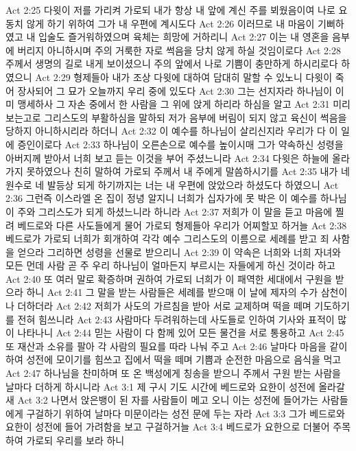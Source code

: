 Act 2:25  다윗이 저를 가리켜 가로되 내가 항상 내 앞에 계신 주를 뵈웠음이여 나로 요동치 않게 하기 위하여 그가 내 우편에 계시도다
Act 2:26  이러므로 내 마음이 기뻐하였고 내 입술도 즐거워하였으며 육체는 희망에 거하리니
Act 2:27  이는 내 영혼을 음부에 버리지 아니하시며 주의 거룩한 자로 썩음을 당치 않게 하실 것임이로다
Act 2:28  주께서 생명의 길로 내게 보이셨으니 주의 앞에서 나로 기쁨이 충만하게 하시리로다 하였으니
Act 2:29  형제들아 내가 조상 다윗에 대하여 담대히 말할 수 있노니 다윗이 죽어 장사되어 그 묘가 오늘까지 우리 중에 있도다
Act 2:30  그는 선지자라 하나님이 이미 맹세하사 그 자손 중에서 한 사람을 그 위에 앉게 하리라 하심을 알고
Act 2:31  미리 보는고로 그리스도의 부활하심을 말하되 저가 음부에 버림이 되지 않고 육신이 썩음을 당하지 아니하시리라 하더니
Act 2:32  이 예수를 하나님이 살리신지라 우리가 다 이 일에 증인이로다
Act 2:33  하나님이 오른손으로 예수를 높이시매 그가 약속하신 성령을 아버지께 받아서 너희 보고 듣는 이것을 부어 주셨느니라
Act 2:34  다윗은 하늘에 올라가지 못하였으나 친히 말하여 가로되 주께서 내 주에게 말씀하시기를
Act 2:35  내가 네 원수로 네 발등상 되게 하기까지는 너는 내 우편에 앉았으라 하셨도다 하였으니
Act 2:36  그런즉 이스라엘 온 집이 정녕 알지니 너희가 십자가에 못 박은 이 예수를 하나님이 주와 그리스도가 되게 하셨느니라 하니라
Act 2:37  저희가 이 말을 듣고 마음에 찔려 베드로와 다른 사도들에게 물어 가로되 형제들아 우리가 어찌할꼬 하거늘
Act 2:38  베드로가 가로되 너희가 회개하여 각각 예수 그리스도의 이름으로 세례를 받고 죄 사함을 얻으라 그리하면 성령을 선물로 받으리니
Act 2:39  이 약속은 너희와 너희 자녀와 모든 먼데 사람 곧 주 우리 하나님이 얼마든지 부르시는 자들에게 하신 것이라 하고
Act 2:40  또 여러 말로 확증하며 권하여 가로되 너희가 이 패역한 세대에서 구원을 받으라 하니
Act 2:41  그 말을 받는 사람들은 세례를 받으매 이 날에 제자의 수가 삼천이나 더하더라
Act 2:42  저희가 사도의 가르침을 받아 서로 교제하며 떡을 떼며 기도하기를 전혀 힘쓰니라
Act 2:43  사람마다 두려워하는데 사도들로 인하여 기사와 표적이 많이 나타나니
Act 2:44  믿는 사람이 다 함께 있어 모든 물건을 서로 통용하고
Act 2:45  또 재산과 소유를 팔아 각 사람의 필요를 따라 나눠 주고
Act 2:46  날마다 마음을 같이 하여 성전에 모이기를 힘쓰고 집에서 떡을 떼며 기쁨과 순전한 마음으로 음식을 먹고
Act 2:47  하나님을 찬미하며 또 온 백성에게 칭송을 받으니 주께서 구원 받는 사람을 날마다 더하게 하시니라
Act 3:1  제 구시 기도 시간에 베드로와 요한이 성전에 올라갈새
Act 3:2  나면서 앉은뱅이 된 자를 사람들이 메고 오니 이는 성전에 들어가는 사람들에게 구걸하기 위하여 날마다 미문이라는 성전 문에 두는 자라
Act 3:3  그가 베드로와 요한이 성전에 들어 가려함을 보고 구걸하거늘
Act 3:4  베드로가 요한으로 더불어 주목하여 가로되 우리를 보라 하니
